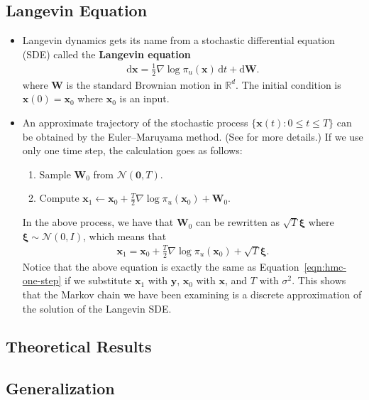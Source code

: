 \documentclass[10pt]{article}
\newcommand{\dee}{\mathrm{d}}
\newcommand{\ve}[1]{\mathbf{#1}}
\newcommand{\ves}[1]{\boldsymbol{#1}}
\newcommand{\mcal}[1]{\mathcal{#1}}
\newcommand{\Real}{\mathbb{R}}
\begin{document}
\subsection{Langevin Equation}

\begin{itemize}
  \item Langevin dynamics gets its name from a stochastic differential equation (SDE) called the {\bf Langevin equation}
  \begin{align*}
    \dee \ve{x} = \frac{1}{2}\nabla \log \pi_u(\ve{x})\, \dee t + \dee \ve{W}.
  \end{align*}
  where $\ve{W}$ is the standard Brownian motion in $\Real^d$. The initial condition is $\ve{x}(0) = \ve{x}_0$ where $\ve{x}_0$ is an input.

  \item An approximate trajectory of the stochastic process $\{ \ve{x}(t) : 0 \leq t \leq T \}$ can be obtained by the Euler--Maruyama method. (See \cite{Khungurn:2022b} for more details.) If we use only one time step, the calculation goes as follows:
  \begin{enumerate}
    \item Sample $\ve{W}_0$ from $\mcal{N}(\ve{0}, T)$.
    \item Compute $\ve{x}_1 \gets \ve{x}_0 + \frac{T}{2} \nabla \log \pi_u(\ve{x}_0) + \ve{W}_0$.
  \end{enumerate}
  In the above process, we have that $\ve{W}_0$ can be rewritten as $\sqrt{T} \ves{\xi}$ where $\ves{\xi} \sim \mcal{N}(0, I)$, which means that
  \begin{align*}
    \ve{x}_1 = \ve{x}_0 + \frac{T}{2} \nabla \log \pi_u(\ve{x}_0) + \sqrt{T} \ves{\xi}.
  \end{align*} 
  Notice that the above equation is exactly the same as Equation~\eqref{eqn:hmc-one-step} if we substitute $\ve{x}_1$ with $\ve{y}$, $\ve{x}_0$ with $\ve{x}$, and $T$ with $\sigma^2$. This shows that the Markov chain we have been examining is a discrete approximation of the solution of the Langevin SDE.
\end{itemize}

\subsection{Theoretical Results}

\subsection{Generalization}


  
\end{document}
